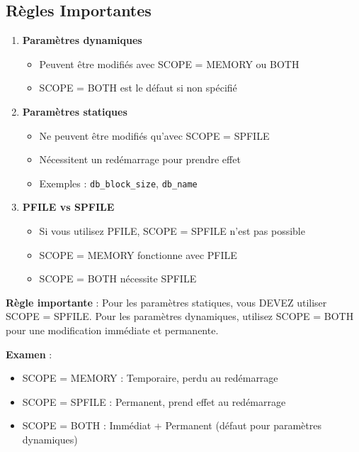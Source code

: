 \documentclass[11pt,a4paper]{article}
\begin{document}
\subsection{Règles Importantes}

\begin{enumerate}
    \item \textbf{Paramètres dynamiques}
    \begin{itemize}
        \item Peuvent être modifiés avec SCOPE = MEMORY ou BOTH
        \item SCOPE = BOTH est le défaut si non spécifié
    \end{itemize}
    
    \item \textbf{Paramètres statiques}
    \begin{itemize}
        \item Ne peuvent être modifiés qu'avec SCOPE = SPFILE
        \item Nécessitent un redémarrage pour prendre effet
        \item Exemples : \texttt{db\_block\_size}, \texttt{db\_name}
    \end{itemize}
    
    \item \textbf{PFILE vs SPFILE}
    \begin{itemize}
        \item Si vous utilisez PFILE, SCOPE = SPFILE n'est pas possible
        \item SCOPE = MEMORY fonctionne avec PFILE
        \item SCOPE = BOTH nécessite SPFILE
    \end{itemize}
\end{enumerate}

\begin{importantbox}
\textbf{Règle importante} : Pour les paramètres statiques, vous DEVEZ utiliser SCOPE = SPFILE. Pour les paramètres dynamiques, utilisez SCOPE = BOTH pour une modification immédiate et permanente.
\end{importantbox}

\begin{tipbox}
\textbf{Examen} : 
\begin{itemize}
    \item SCOPE = MEMORY : Temporaire, perdu au redémarrage
    \item SCOPE = SPFILE : Permanent, prend effet au redémarrage
    \item SCOPE = BOTH : Immédiat + Permanent (défaut pour paramètres dynamiques)
\end{itemize}
\end{tipbox}
\end{document}
